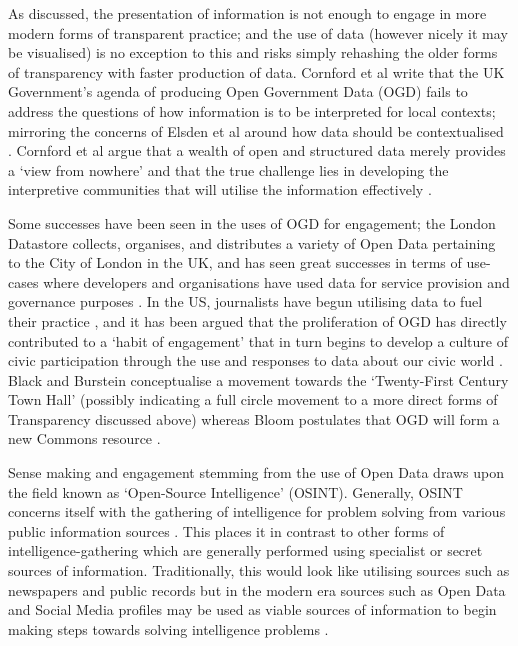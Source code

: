 As discussed, the presentation of information is not enough to engage in more modern forms of transparent practice; and the use of data (however nicely it may be visualised) is no exception to this and risks simply rehashing the older forms of transparency with faster production of data. Cornford et al write that the UK Government's agenda of producing Open Government Data (OGD) fails to address the questions of how information is to be interpreted for local contexts; mirroring the concerns of Elsden et al around how data should be contextualised \cite{cornford_local_2013}. Cornford et al argue that a wealth of open and structured data merely provides a `view from nowhere' and that the true challenge lies in developing the interpretive communities that will utilise the information effectively \cite{cornford_local_2013}.

Some successes have been seen in the uses of OGD for engagement; the London Datastore \cite{noauthor_london_nodate} collects, organises, and distributes a variety of Open Data pertaining to the City of London in the UK, and has seen great successes in terms of use-cases where developers and organisations have used data for service provision and governance purposes \cite{coleman_lessons_2013}. In the US, journalists have begun utilising data to fuel their practice \cite{ramos_journalists_2013}, and it has been argued that the proliferation of OGD has directly contributed to a `habit of engagement' that in turn begins to develop a culture of civic participation through the use and responses to data about our civic world \cite{gordon_making_2013}. Black and Burstein conceptualise a movement towards the `Twenty-First Century Town Hall' \cite{black_local_2013} (possibly indicating a full circle movement to a more direct forms of Transparency discussed above) whereas Bloom postulates that OGD will form a new Commons resource \cite{bloom_towards_2013}.

Sense making and engagement stemming from the use of Open Data draws upon the field known as `Open-Source Intelligence' (OSINT). Generally, OSINT concerns itself with the gathering of intelligence for problem solving from various public information sources \cite{bradbury_plain_2011, glassman_intelligence_2012}. This places it in contrast to other forms of intelligence-gathering which are generally performed using specialist or secret sources of information. Traditionally, this would look like utilising sources such as newspapers and public records but in the modern era sources such as Open Data and Social Media profiles may be used as viable sources of information to begin making steps towards solving intelligence problems \cite{bizer_emerging_2009}.

